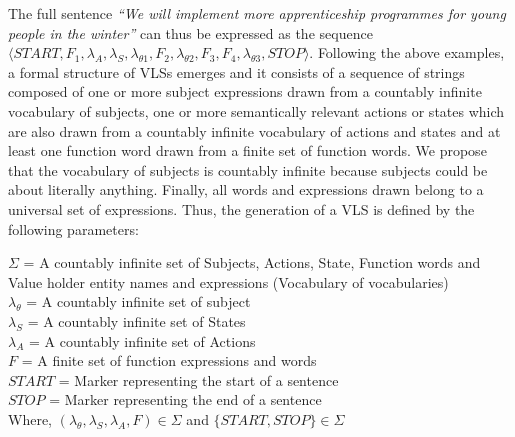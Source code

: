 The full sentence \emph{``We will implement more apprenticeship programmes for young people in the winter''} can thus be expressed as the sequence
$\langle START, F_1, \lambda_A, \lambda_S, \lambda_{\theta1}, F_2, \lambda_{\theta2}, F_3, F_4, \lambda_{\theta3}, STOP \rangle$. Following the above examples, a formal structure of VLSs emerges and it consists of a sequence of strings composed of one or more subject expressions drawn from a countably infinite vocabulary of subjects, one or more semantically relevant actions or states which are also drawn from a countably infinite vocabulary of actions and states and at least one function word drawn from a finite set of function words. We propose that the vocabulary of subjects is countably infinite because subjects could be about literally anything. Finally, all words and expressions drawn belong to a universal set of expressions.
Thus, the generation of a VLS is defined by the following parameters:
\begin{center}
$\Sigma$ = A countably infinite set of Subjects, Actions, State, Function words and Value holder entity names and expressions (Vocabulary of vocabularies)\\
$\lambda_\theta$ = A countably infinite set of subject\\
$\lambda_S$ = A countably infinite set of States\\
$\lambda_A$ = A countably infinite set of Actions\\
$F$ = A finite set of function expressions and words\\
$START$ = Marker representing the start of a sentence\\
$STOP$ = Marker representing the end of a sentence\\
Where, $(\lambda_\theta, \lambda_S, \lambda_A, F) \in \Sigma $ and $\{START, STOP\} \in \Sigma$
\end{center}

